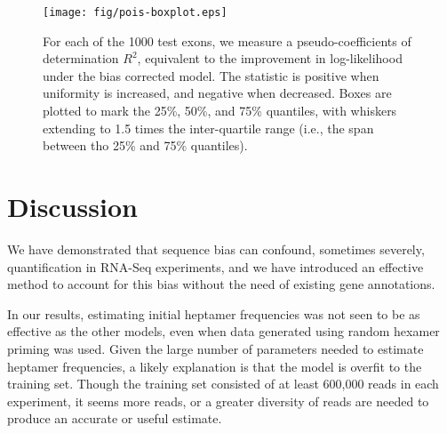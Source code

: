 \documentclass{bioinfo}
\begin{document}
\begin{figure}
\centerline{\texttt{[image: fig/pois-boxplot.eps]}}
\caption{For each of the 1000 test exons, we measure a pseudo-coefficients of
determination $R^2$, equivalent to the improvement in log-likelihood under the
bias corrected model. The statistic is positive when uniformity is increased,
and negative when decreased. Boxes are plotted to mark the 25\%, 50\%, and 75\%
quantiles, with whiskers extending to 1.5 times the inter-quartile range (i.e.,
the span between tho 25\% and 75\% quantiles).
}


    \label{fig:pois}
\end{figure}


\begin{table}
\end{table}



\section{Discussion}

We have demonstrated that sequence bias can confound, sometimes severely,
quantification in RNA-Seq experiments, and we have introduced an effective
method to account for this bias without the need of existing gene annotations.

In our results, estimating initial heptamer frequencies was not seen to be as
effective as the other models, even when data generated using random hexamer
priming was used. Given the large number of parameters needed to estimate
heptamer frequencies, a likely explanation is that the model is overfit to the
training set. Though the training set consisted of at least 600,000 reads in
each experiment, it seems more reads, or a greater diversity of reads are needed
to produce an accurate or useful estimate.
\end{document}
